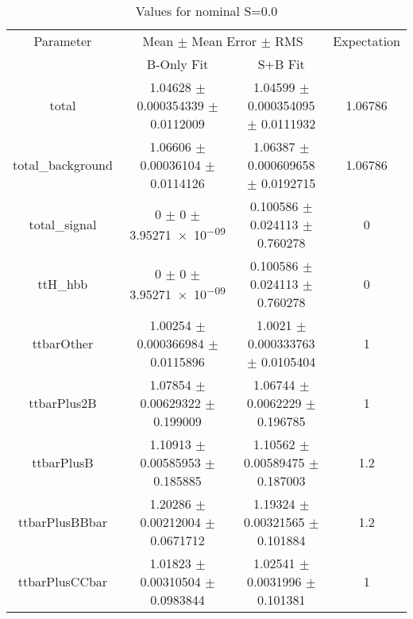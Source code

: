 \begin{table}
\centering
\caption{Values for nominal S=0.0}
\begin{tabular}{cccc}
\toprule
Parameter & \multicolumn{2}{c}{Mean $\pm$ Mean Error $\pm$ RMS} & Expectation\\
 & B-Only Fit & S+B Fit & \\
\midrule
total & \num{1.04628} $\pm$ \num{0.000354339} $\pm$ \num{0.0112009} & \num{1.04599} $\pm$ \num{0.000354095} $\pm$ \num{0.0111932} & \num{1.06786}\\
total\_background & \num{1.06606} $\pm$ \num{0.00036104} $\pm$ \num{0.0114126} & \num{1.06387} $\pm$ \num{0.000609658} $\pm$ \num{0.0192715} & \num{1.06786}\\
total\_signal & \num{0} $\pm$ \num{0} $\pm$ \num{3.95271e-09} & \num{0.100586} $\pm$ \num{0.024113} $\pm$ \num{0.760278} & \num{0}\\
ttH\_hbb & \num{0} $\pm$ \num{0} $\pm$ \num{3.95271e-09} & \num{0.100586} $\pm$ \num{0.024113} $\pm$ \num{0.760278} & \num{0}\\
ttbarOther & \num{1.00254} $\pm$ \num{0.000366984} $\pm$ \num{0.0115896} & \num{1.0021} $\pm$ \num{0.000333763} $\pm$ \num{0.0105404} & \num{1}\\
ttbarPlus2B & \num{1.07854} $\pm$ \num{0.00629322} $\pm$ \num{0.199009} & \num{1.06744} $\pm$ \num{0.0062229} $\pm$ \num{0.196785} & \num{1}\\
ttbarPlusB & \num{1.10913} $\pm$ \num{0.00585953} $\pm$ \num{0.185885} & \num{1.10562} $\pm$ \num{0.00589475} $\pm$ \num{0.187003} & \num{1.2}\\
ttbarPlusBBbar & \num{1.20286} $\pm$ \num{0.00212004} $\pm$ \num{0.0671712} & \num{1.19324} $\pm$ \num{0.00321565} $\pm$ \num{0.101884} & \num{1.2}\\
ttbarPlusCCbar & \num{1.01823} $\pm$ \num{0.00310504} $\pm$ \num{0.0983844} & \num{1.02541} $\pm$ \num{0.0031996} $\pm$ \num{0.101381} & \num{1}\\
\bottomrule
\end{tabular}
\end{table}